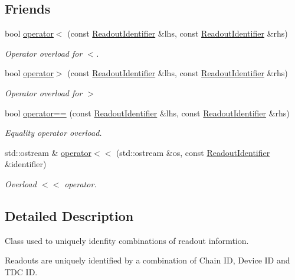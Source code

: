 \subsection*{Friends}
\begin{DoxyCompactItemize}
\item 
bool \hyperlink{class_readout_identifier_aa0d096b09bfc6a21f2c29ec777e101f8}{operator$<$} (const \hyperlink{class_readout_identifier}{Readout\+Identifier} \&lhs, const \hyperlink{class_readout_identifier}{Readout\+Identifier} \&rhs)
\begin{DoxyCompactList}\small\item\em Operator overload for $<$. \end{DoxyCompactList}\item 
bool \hyperlink{class_readout_identifier_a8738ea1dc34492f456b68bb02aec8966}{operator$>$} (const \hyperlink{class_readout_identifier}{Readout\+Identifier} \&lhs, const \hyperlink{class_readout_identifier}{Readout\+Identifier} \&rhs)
\begin{DoxyCompactList}\small\item\em Operator overload for $>$ \end{DoxyCompactList}\item 
bool \hyperlink{class_readout_identifier_a91bb6963f51c84fd2d8bcf104fc0b226}{operator==} (const \hyperlink{class_readout_identifier}{Readout\+Identifier} \&lhs, const \hyperlink{class_readout_identifier}{Readout\+Identifier} \&rhs)
\begin{DoxyCompactList}\small\item\em Equality operator overload. \end{DoxyCompactList}\item 
std\+::ostream \& \hyperlink{class_readout_identifier_a62474a342fbe3d79da5b8a869d95e72e}{operator$<$$<$} (std\+::ostream \&os, const \hyperlink{class_readout_identifier}{Readout\+Identifier} \&identifier)
\begin{DoxyCompactList}\small\item\em Overload $<$$<$ operator. \end{DoxyCompactList}\end{DoxyCompactItemize}


\subsection{Detailed Description}
Class used to uniquely idenfity combinations of readout informtion. 

Readouts are uniquely identified by a combination of Chain ID, Device ID and T\+DC ID.

